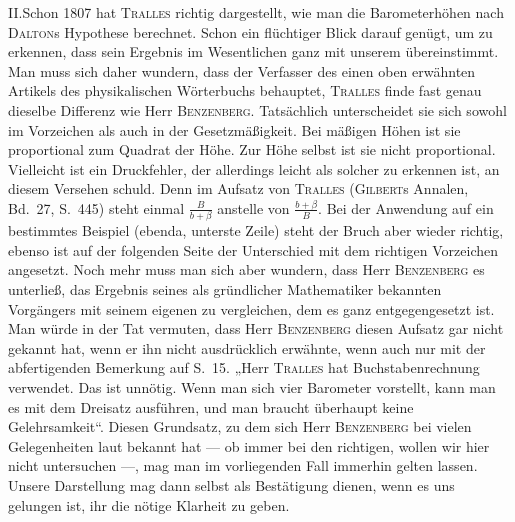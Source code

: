 II.\quad Schon 1807 hat \textsc{Tralles} richtig dargestellt, wie man die Barometerhöhen nach \textsc{Dalton}s Hypothese berechnet. Schon ein flüchtiger Blick darauf genügt, um zu erkennen, dass sein Ergebnis im Wesentlichen ganz mit unserem übereinstimmt. Man muss sich daher wundern, dass der Verfasser des einen oben erwähnten Artikels des physikalischen Wörterbuchs behauptet, \textsc{Tralles} finde fast genau dieselbe Differenz wie Herr \textsc{Benzenberg}. Tatsächlich unterscheidet sie sich sowohl im Vorzeichen als auch in der Gesetzmäßigkeit. Bei mäßigen
Höhen ist sie proportional zum Quadrat der Höhe. Zur Höhe selbst ist sie nicht proportional. Vielleicht ist ein Druckfehler, der allerdings leicht als solcher zu erkennen ist, an diesem Versehen schuld. Denn im Aufsatz von \textsc{Tralles} (\textsc{Gilbert}s Annalen, Bd.\ 27, S.\ 445) steht einmal $\frac{B}{b+\beta}$ anstelle von $\frac{b+\beta}{B}$. Bei der Anwendung auf ein bestimmtes Beispiel (ebenda, unterste Zeile) steht der Bruch aber wieder richtig, ebenso ist auf der folgenden Seite der Unterschied mit dem richtigen Vorzeichen angesetzt. Noch mehr muss man sich aber wundern, dass Herr \textsc{Benzenberg} es unterließ, das Ergebnis seines als gründlicher Mathematiker bekannten Vorgängers mit seinem eigenen zu vergleichen, dem es ganz entgegengesetzt ist. Man würde in der Tat vermuten, dass Herr \textsc{Benzenberg} diesen Aufsatz gar nicht gekannt hat, wenn er ihn nicht ausdrücklich erwähnte, wenn auch nur mit der abfertigenden Bemerkung auf S.\ 15. „Herr \textsc{Tralles} hat Buchstabenrechnung verwendet. Das ist unnötig. Wenn man sich vier Barometer vorstellt, kann man es mit dem Dreisatz ausführen, und man braucht überhaupt keine Gelehrsamkeit“. Diesen Grundsatz, zu dem sich Herr \textsc{Benzenberg} bei vielen Gelegenheiten laut bekannt hat — ob immer bei den richtigen, wollen wir hier nicht untersuchen —, mag man im vorliegenden Fall immerhin gelten lassen. Unsere Darstellung mag dann selbst als Bestätigung dienen, wenn es uns gelungen ist, ihr die nötige Klarheit zu geben.

